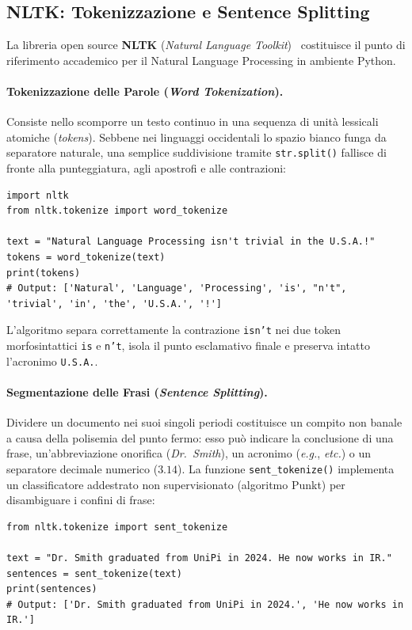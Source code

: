 \FloatBarrier
\subsection{NLTK: Tokenizzazione e Sentence Splitting}
\label{subsec:nltk-tokenizzazione}

La libreria open source \textbf{NLTK} (\textit{Natural Language Toolkit})~\cite{bird2009} costituisce il punto di riferimento accademico per il Natural Language Processing in ambiente Python.

\paragraph{Tokenizzazione delle Parole (\textit{Word Tokenization}).}
Consiste nello scomporre un testo continuo in una sequenza di unit\`a lessicali atomiche (\textit{tokens}). Sebbene nei linguaggi occidentali lo spazio bianco funga da separatore naturale, una semplice suddivisione tramite \texttt{str.split()} fallisce di fronte alla punteggiatura, agli apostrofi e alle contrazioni:

\begin{lstlisting}[style=pythoncode,caption={Tokenizzazione con NLTK.}]
import nltk
from nltk.tokenize import word_tokenize

text = "Natural Language Processing isn't trivial in the U.S.A.!"
tokens = word_tokenize(text)
print(tokens)
# Output: ['Natural', 'Language', 'Processing', 'is', "n't", 'trivial', 'in', 'the', 'U.S.A.', '!']
\end{lstlisting}
L'algoritmo separa correttamente la contrazione \texttt{isn't} nei due token morfosintattici \texttt{is} e \texttt{n't}, isola il punto esclamativo finale e preserva intatto l'acronimo \texttt{U.S.A.}.

\paragraph{Segmentazione delle Frasi (\textit{Sentence Splitting}).}
Dividere un documento nei suoi singoli periodi costituisce un compito non banale a causa della polisemia del punto fermo: esso pu\`o indicare la conclusione di una frase, un'abbreviazione onorifica (\textit{Dr.~Smith}), un acronimo (\textit{e.g.}, \textit{etc.}) o un separatore decimale numerico ($3.14$). La funzione \texttt{sent\_tokenize()} implementa un classificatore addestrato non supervisionato (algoritmo Punkt) per disambiguare i confini di frase:

\begin{lstlisting}[style=pythoncode,caption={Sentence splitting con \texttt{sent\_tokenize}.}]
from nltk.tokenize import sent_tokenize

text = "Dr. Smith graduated from UniPi in 2024. He now works in IR."
sentences = sent_tokenize(text)
print(sentences)
# Output: ['Dr. Smith graduated from UniPi in 2024.', 'He now works in IR.']
\end{lstlisting}

